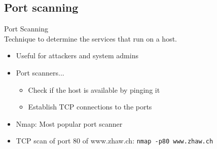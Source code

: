 \subsection{Port scanning}

\begin{definition}{Port Scanning}\\
    Technique to determine the services that run on a host.
    \begin{itemize}
        \item Useful for attackers and system admins
        \item Port scanners...
        \begin{itemize}
            \item Check if the host is available by pinging it
            \item Establish TCP connections to the ports
        \end{itemize}
        \item Nmap: Most popular port scanner
        \item TCP scan of port 80 of www.zhaw.ch: \texttt{nmap -p80 www.zhaw.ch}
    \end{itemize}
\end{definition}